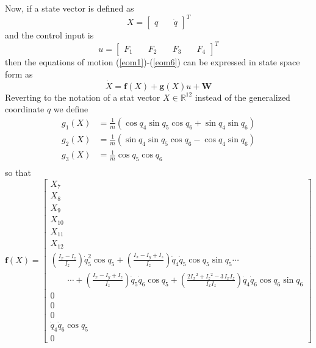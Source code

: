 \documentclass[twocolumn,10pt]{asme2e}
\begin{document}
{Now, if a state vector is defined as
\begin{equation}
	X= \left[\begin{array}{cc}
		q&\quad
		\dot{q}
	\end{array}\right]^T
\end{equation}
and the control input is 
\begin{equation}
	u= \left[\begin{array}{cccc}
		F_1&\quad
		F_2&\quad
		F_3&\quad
		F_4
	\end{array}\right]^T
\end{equation}
then the equations of motion (\ref{eom1})-(\ref{eom6}) can be expressed in state space form as
\begin{equation}
\dot{X}=\textbf{f}(X)+\textbf{g}(X)u+\textbf{W}\label{eqssM}
\end{equation}
Reverting to the notation of a stat vector $X\in\mathbb{R}^{12}$ instead of the generalized coordinate $q$ we define 
\begin{align}
	g_1(X)&=\tfrac{1}{m}\left(\cos q_4 \sin q_5 \cos q_6+\sin q_4\sin q_6\right)\\
	g_2(X)&=\tfrac{1}{m}\left(\sin q_4 \sin q_5 \cos q_6-\cos q_4\sin q_6\right)\\
	g_3(X)&=\tfrac{1}{m}\cos q_{5}\cos q_{6}\\
\end{align}
so that
\begin{equation}
	\textbf{f}(X)=\left[\begin{array}{c}
		X_7\\
	X_8\\
		X_9\\
		X_{10}\\
		X_{11}\\
	X_{12}\\ \left(\frac{I_{x}-I_{z}}{I_z}\right)\dot{q}_{5}^2\cos{q}_{5}+\left(\frac{I_{x}-I_y+I_z}{I_z}\right)\dot{q}_{4}\dot{q}_{5}\cos{q}_{5}\sin{q}_{5}\cdots\\\qquad\cdots+\left(\frac{I_{x}-I_y+I_z}{I_z}\right)\dot{q}_{5}\dot{q}_{6}\cos{q}_{5}+\left(\frac{2{I_{x}}^2+{I_{z}}^2-3\,I_{x}I_{z}}{I_xI_z}\right)\dot{q}_{4}\dot{q}_{6}\cos{q}_{6}\sin{q}_{6}\\
		0\\
		0\\
		0\\
		\dot{q}_4\dot{q}_6\cos{q}_5\\
		0
	\end{array}\right]
\end{equation}
}
\end{document}
